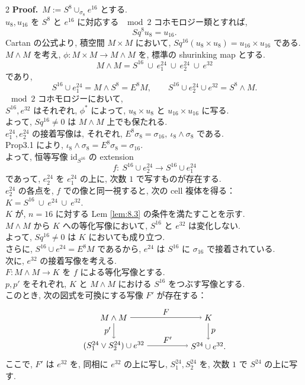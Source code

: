 \documentclass[10pt, leqno]{ltjsarticle}
\newcommand{\id}{\mathrm{id}}
\numberwithin{equation}{section}
\theoremstyle{plain}
\theoremstyle{definition}
\theoremstyle{remark}
\begin{document}
\begin{paracol}{2}
\noindent
\textbf{Proof.}\
\(
M := S^8\cup_{\sigma_8} e^{16}
\)
とする. \\
$u_8,u_{16}$ を $S^8$ と $e^{16}$ に対応する $\mod 2$ コホモロジー類とすれば,
\[
Sq^8 u_8=u_{16}.
\]
Cartan の公式より, 
積空間 $M\times M$ において,
$Sq^{16}(u_8\times u_8) = u_{16}\times u_{16}$ である. \\
$M\wedge  M$ を考え, 
$\phi : M\times M\to M\wedge M$ を, 標準の shurinking map とする. \\
\[
M\wedge M = S^{16}\ \cup\ e^{24}_1\ \cup\ e^{24}_2\ \cup\ e^{32}
\]
であり,
\[
S^{16}\cup e^{24}_1 = M\wedge S^8 = E^8 M,\qquad
S^{16}\cup e^{24}_2\cup e^{32} = S^8 \wedge M.
\] 
$\mod2$ コホモロジーにおいて, \\
$S^{16},e^{32}$ はそれぞれ,
\(\phi^*\) によって, 
\(u_8\times u_8\) と $u_{16}\times u_{16}$ に写る.\\
よって, $Sq^{16}\neq0$ は $M\wedge M$ 上でも保たれる. \\
\(e_1^{24}, e_2^{24}\) の接着写像は, それぞれ, 
\(E^8\sigma_8 = \sigma_{16},\ \iota_8\wedge\sigma_8\) である.\\
Prop3.1 により,
\(\iota_8\wedge\sigma_8 = E^8\sigma_8 = \sigma_{16}\).\\
よって, 恒等写像 $\id_{S^{16}}$ の extension 
\[
f:\ S^{16}\cup e^{24}_2\longrightarrow S^{16}\cup e^{24}_1
\]
であって, $e^{24}_2$ を $e^{24}_1$ の上に, 次数 $1$ で写すものが存在する. \\
$e^{24}_2$ の各点を, $f$ での像と同一視すると, 次の cell 複体を得る：
\(
K=S^{16}\ \cup\ e^{24}\ \cup\ e^{32}.
\)\\
$K$ が, \(n=16\) に対する Lem \ref{lem:8.3} の条件を満たすことを示す. \\
\(M\wedge M\) から \(K\) への等化写像において, 
$S^{16}$ と $e^{32}$ は変化しない.\\
よって,
$Sq^{16}\neq0$ は \(K\) においても成り立つ. \\
さらに, $S^{16}\cup e^{24}= E^8M$ であるから, 
$e^{24}$ は \(S^{16}\) に $\sigma_{16}$ で接着されている. \\
次に, $e^{32}$ の接着写像を考える.\\
\(F:M\wedge M\to K\) 
を \(f\) による等化写像とする.\\
$p,p'$ をそれぞれ, $K$ と $M\wedge M$ における
$S^{16}$ をつぶす写像とする. \\
このとき, 次の図式を可換にする写像 $F'$ が存在する：
\[
\begin{tikzpicture}[baseline=(current bounding box.center)]
\node (A) at (0,1.2) {$M\wedge M$};
\node (B) at (4,1.2) {$K$};
\node (C) at (0,0) {$(S^{24}_1\vee S^{24}_2)\cup e^{32}$};
\node (D) at (4,0) {$S^{24}\cup e^{32}.$};
\draw[->] (A) -- node[above] {$F$} (B);
\draw[->] (A) -- node[left] {$p'$} (C);
\draw[->] (B) -- node[right] {$p$} (D);
\draw[->] (C) -- node[above] {$F'$} (D);
\end{tikzpicture}
\]
ここで, $F'$ は $e^{32}$ を, 同相に $e^{32}$ の上に写し, 
$S^{24}_1,S^{24}_2$ を, 次数 $1$ で $S^{24}$ の上に写す. 


\end{paracol}
\end{document}

